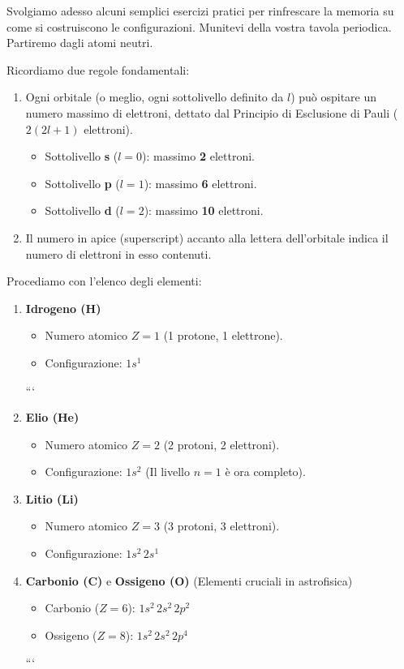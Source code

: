 Svolgiamo adesso alcuni semplici esercizi pratici per rinfrescare la memoria su come si costruiscono le configurazioni. Munitevi della vostra tavola periodica. Partiremo dagli atomi neutri.

Ricordiamo due regole fondamentali:
\begin{enumerate}
\item Ogni orbitale (o meglio, ogni sottolivello definito da $l$) può ospitare un numero massimo di elettroni, dettato dal Principio di Esclusione di Pauli ($2(2l+1)$ elettroni).
\begin{itemize}
\item Sottolivello \textbf{s} ($l=0$): massimo \textbf{2} elettroni.
\item Sottolivello \textbf{p} ($l=1$): massimo \textbf{6} elettroni.
\item Sottolivello \textbf{d} ($l=2$): massimo \textbf{10} elettroni.
\end{itemize}
\item Il numero in apice (superscript) accanto alla lettera dell'orbitale indica il numero di elettroni in esso contenuti.
\end{enumerate}

Procediamo con l'elenco degli elementi:

\begin{enumerate}
\item \textbf{Idrogeno (H)}
\begin{itemize}
\item Numero atomico $Z = 1$ (1 protone, 1 elettrone).
\item Configurazione: \textbf{$1s^1$}
\end{itemize}

```
\item \textbf{Elio (He)}
\begin{itemize}
    \item Numero atomico $Z = 2$ (2 protoni, 2 elettroni).
    \item Configurazione: \textbf{$1s^2$} (Il livello $n=1$ è ora completo).
\end{itemize}

\item \textbf{Litio (Li)}
\begin{itemize}
    \item Numero atomico $Z = 3$ (3 protoni, 3 elettroni).
    \item Configurazione: \textbf{$1s^2 \, 2s^1$}
\end{itemize}

\item \textbf{Carbonio (C)} e \textbf{Ossigeno (O)} (Elementi cruciali in astrofisica)
\begin{itemize}
    \item Carbonio ($Z = 6$): \textbf{$1s^2 \, 2s^2 \, 2p^2$}
    \item Ossigeno ($Z = 8$): \textbf{$1s^2 \, 2s^2 \, 2p^4$}
\end{itemize}

```

\end{enumerate}

